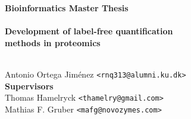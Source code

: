 \documentclass[11pt, a4paper]{report}
\begin{document}

    \thispagestyle{empty}
    \begin{adjustwidth}{-3cm}{-1.5cm}
    \vspace*{-1cm}
    \textbf{\Huge Bioinformatics Master Thesis} \\
    \vspace*{2.5cm} \\
    \textbf{\Huge Development of label-free quantification \\ methods in proteomics} \\
    \vspace*{.1cm} \\
    \begin{tabbing}
    Antonio Ortega Jiménez \hspace{1cm} \= \texttt{<rnq313@alumni.ku.dk>}
    \\[10.5cm] 
    
    \textbf{\Large Supervisors} \\
    Thomas Hamelryck \> \texttt{<thamelry@gmail.com>} \\
    Mathias F. Gruber \> \texttt{<mafg@novozymes.com>} \\

    \end{tabbing}
    \end{adjustwidth}
    \ClearWallPaper

\setcounter{tocdepth}{2}
\tableofcontents %
\listoffigures   %
\newpage


\newpage
\end{document}
